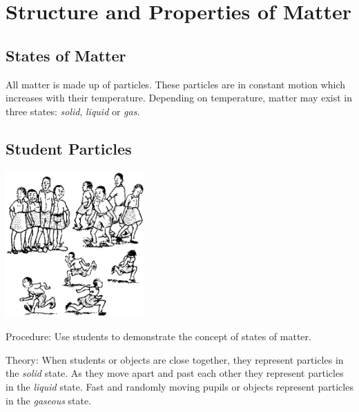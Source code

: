 \section{Structure and Properties of Matter}

\begin{multicols}{2}

\section*{States of Matter} \label{sec:states-matter}
All matter is made up of particles. These particles are in constant motion which increases with their temperature. Depending on temperature, matter may exist in three states: \emph{solid}, \emph{liquid} or \emph{gas}.


\subsection{Student Particles}

\begin{center}
\includegraphics[width=0.4\textwidth]{./img/source/states-matter.png}
\end{center}

\begin{description*}
\item[Procedure:]{Use students to demonstrate the concept of states of matter.}
\item[Theory:]{When students or objects are close together, they represent particles in the \emph{solid} state. As they move apart and past each other they represent particles in the \emph{liquid} state. Fast and randomly moving pupils or objects represent particles in the \emph{gaseous} state.}
\end{description*}


\end{multicols}
